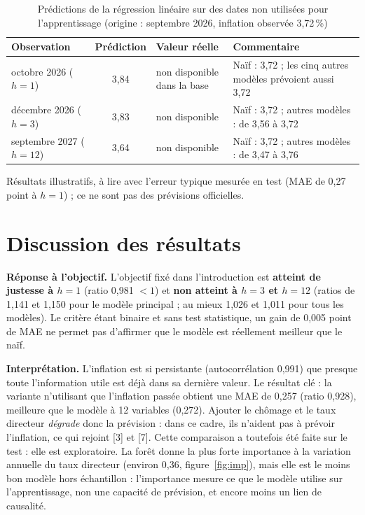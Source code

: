 \documentclass[11pt,a4paper]{article}
\begin{document}
\begin{table}[H]\centering\small
\caption{Prédictions de la régression linéaire sur des dates non utilisées pour l'apprentissage (origine : septembre 2026, inflation observée 3,72\,\%)}\label{tab:pred}
\begin{tabular}{@{}p{2.5cm}cp{2.6cm}p{6.2cm}@{}}
\toprule
Observation & Prédiction & Valeur réelle & Commentaire\\\midrule
octobre 2026 ($h=1$) & 3,84 & non disponible dans la base & Naïf : 3,72 ; les cinq autres modèles prévoient aussi 3,72\\
décembre 2026 ($h=3$) & 3,83 & non disponible & Naïf : 3,72 ; autres modèles : de 3,56 à 3,72\\
septembre 2027 ($h=12$) & 3,64 & non disponible & Naïf : 3,72 ; autres modèles : de 3,47 à 3,76\\
\bottomrule
\end{tabular}
\end{table}
{\small Résultats illustratifs, à lire avec l'erreur typique mesurée en test (MAE de 0,27 point à $h=1$) ; ce ne sont pas des prévisions officielles.}

\section{Discussion des résultats}
\textbf{Réponse à l'objectif.} L'objectif fixé dans l'introduction est \textbf{atteint de justesse à $h=1$} (ratio 0,981 $<1$) et \textbf{non atteint à $h=3$ et $h=12$} (ratios de 1,141 et 1,150 pour le modèle principal ; au mieux 1,026 et 1,011 pour tous les modèles). Le critère étant binaire et sans test statistique, un gain de 0,005 point de MAE ne permet pas d'affirmer que le modèle est réellement meilleur que le naïf.

\textbf{Interprétation.} L'inflation est si persistante (autocorrélation 0,991) que presque toute l'information utile est déjà dans sa dernière valeur. Le résultat clé : la variante n'utilisant que l'inflation passée obtient une MAE de 0,257 (ratio 0,928), meilleure que le modèle à 12 variables (0,272). Ajouter le chômage et le taux directeur \emph{dégrade} donc la prévision : dans ce cadre, ils n'aident pas à prévoir l'inflation, ce qui rejoint [3] et [7]. Cette comparaison a toutefois été faite sur le test : elle est exploratoire. La forêt donne la plus forte importance à la variation annuelle du taux directeur (environ 0,36, figure~\ref{fig:imp}), mais elle est le moins bon modèle hors échantillon : l'importance mesure ce que le modèle utilise sur l'apprentissage, non une capacité de prévision, et encore moins un lien de causalité.
\end{document}

